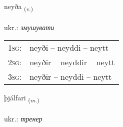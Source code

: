 \documentclass[frontgrid, backgrid]{flacards}\usepackage[]{graphicx}\usepackage[]{xcolor}
\begin{document}
\renewcommand{\flhead}{\vskip5pt \fboxsep=0pt {\small\bfseries\footnotesize Sagnorð | дієслово}}
\renewcommand{\fcfoot}{\vskip5pt \fboxsep=0pt \hspace{2pt}{\small\bfseries\footnotesize 3K}}

\renewcommand{\blhead}{\vskip5pt {\small\bfseries\footnotesize Sagnorð | дієслово }}
\renewcommand{\bcfoot}{\vskip5pt \hspace{2pt}{\small\bfseries\footnotesize 3K}}


{neyða \small{\textsubscript{(\textit{v.})}} \\[1ex] %
\textphonetic{[neiːða]} \\
ukr.: \emph{змушувати} \\  [2ex]
\renewcommand*{\arraystretch}{0.8}
\begin{tabular}{p{1cm}l}
\textsc{1sg}: & neyði -- neyddi -- neytt \\ 
\textsc{2sg}: & neyðir -- neyddir -- neytt \\ 
\textsc{3sg}: & neyðir -- neyddi -- neytt \\ 
\end{tabular}
}

\renewcommand{\flhead}{\vskip5pt \fboxsep=0pt {\small\bfseries\footnotesize Nafnorð | іменник}}
\renewcommand{\fcfoot}{\vskip5pt \fboxsep=0pt \hspace{2pt}{\small\bfseries\footnotesize 3K}}

\renewcommand{\blhead}{\vskip5pt {\small\bfseries\footnotesize Nafnorð | іменник }}
\renewcommand{\bcfoot}{\vskip5pt \hspace{2pt}{\small\bfseries\footnotesize 3K}}


{þjálfari \small{\textsubscript{(\textit{m.})}} \\[1ex] %
\textphonetic{[θjaulvarɪ]} \\
ukr.: \emph{тренер} \\  [2ex]
\renewcommand*{\arraystretch}{0.8}
}
\end{document}
